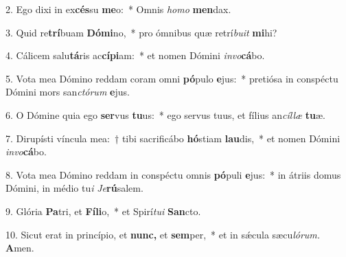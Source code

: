 \item 2. Ego dixi in ex\textbf{cés}su \textbf{me}o:~* Omnis \textit{homo} \textbf{men}dax.
\item 3. Quid re\textbf{trí}buam \textbf{Dó}\textbf{mi}no,~* pro ómnibus quæ retrí\textit{buit} \textbf{mi}hi?
\item 4. Cálicem salu\textbf{tá}ris ac\textbf{cí}\textbf{pi}am:~* et nomen Dómini \textit{invo}\textbf{cá}bo.
\item 5. Vota mea Dómino reddam coram omni \textbf{pó}pulo \textbf{e}jus:~* pretiósa in conspé\-ctu Dómini mors san\textit{ctórum} \textbf{e}jus.
\item 6. O Dómine quia ego \textbf{ser}vus \textbf{tu}us:~* ego servus tuus, et fílius an\textit{cíllæ} \textbf{tu}æ.
\item 7. Dirupísti víncula mea:~† tibi sacrificábo \textbf{hó}stiam \textbf{lau}dis,~* et nomen Dómini \textit{invo}\textbf{cá}bo.
\item 8. Vota mea Dómino reddam in conspéctu omnis \textbf{pó}puli \textbf{e}jus:~* in átriis domus Dómini, in médio tu\tinyhspace\textit{i} \textit{Je}\textbf{rú}salem.
\item 9. Glória \textbf{Pa}tri, et \textbf{Fí}\textbf{li}o,~* et Spirí\tinyhspace\textit{tui} \textbf{San}cto.
\item 10. Sicut erat in princípio, et \textbf{nunc,} et \textbf{sem}per,~* et in sǽcula sæcu\tinyhspace\textit{lórum.} \textbf{A}men.